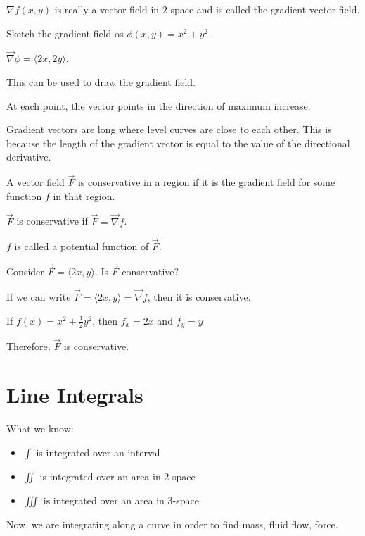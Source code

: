 \documentclass[../calc3.tex]{subfiles}
\begin{document}
$\nabla f(x,y)$ is really a vector field in $2$-space and is called the gradient vector field.

\begin{example}
    Sketch the gradient field os $\phi(x,y)=x^2+y^2$.

    $\vec{\nabla}\phi = \langle 2x,2y\rangle$.

    This can be used to draw the gradient field.

    At each point, the vector points in the direction of maximum increase.
\end{example} 

Gradient vectors are long where level curves are close to each other. This is because the length of the gradient vector is equal to the value of the directional derivative.

\begin{definition}
    A vector field $\vec{F}$ is conservative in a region if it is the gradient field for some function $f$ in that region.

    $\vec{F}$ is conservative if $\vec{F}=\vec{\nabla}f$.

    $f$ is called a potential function of $\vec{F}$.
\end{definition}

\begin{example}
    Consider $\vec{F}=\langle 2x,y\rangle$. Is $\vec{F}$ conservative?

    If we can write $\vec{F}=\langle 2x,y\rangle = \vec{\nabla}f$, then it is conservative.

    If $f(x)=x^2+\frac{1}{2}y^2$, then $f_x=2x$ and $f_y=y$

    Therefore, $\vec{F}$ is conservative.
\end{example}

\section{Line Integrals}
What we know:
\begin{itemize}
    \item $\int$ is integrated over an interval
    \item $\iint$ is integrated over an area in $2$-space
    \item $\iiint$ is integrated over an area in $3$-space
\end{itemize}

Now, we are integrating along a curve in order to find mass, fluid flow, force.
\end{document}

